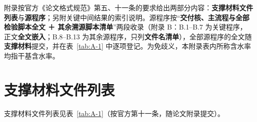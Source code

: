 \appendix
附录按官方《论文格式规范》第五、十一条的要求给出两部分内容：\textbf{支撑材料文件列表}与\textbf{源程序}；另附关键中间结果的索引说明。源程序按“\textbf{交付核、主流程与全部检验脚本全文 ＋ 其余溯源脚本清单}”两段收录（附录 B：B.1–B.7 为关键程序，正文\textbf{全文嵌入}；B.8–B.13 为其余源程序，只列\textbf{文件名清单}），全部源程序的全文随\textbf{支撑材料}提交，并在表~\ref{tab:A-1} 中逐项登记。为免歧义，本附录表内所称含水率均指干基含水率。

\section{支撑材料文件列表}
支撑材料文件列表见表~\ref{tab:A-1}（按官方第十一条，随论文附录提交）。




